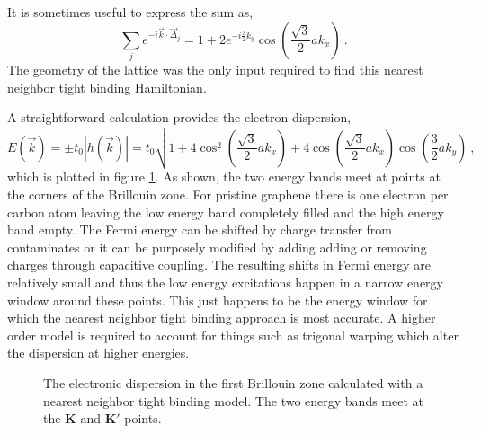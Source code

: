 It is sometimes useful to express the sum as,
\begin{equation*}
	\sum_{j} e^{-i \vec{k} \cdot \vec{\Delta}_j}
		=1+2 e^{-i \frac{3}{2} k_y}\cos \left(\frac{\sqrt{3}}{2} a k_x \right) \ .
\end{equation*}
The geometry of the lattice was the only input required to find this nearest neighbor tight binding Hamiltonian.

A straightforward calculation provides the electron dispersion,
\begin{equation*}
	E(\vec{k})=\pm t_0 |h(\vec{k})|=t_0 \sqrt{1+4 \cos^2 \left(\frac{\sqrt{3}}{2} a k_x\right)
		+4 \cos\left(\frac{\sqrt{3}}{2} a k_x \right) \cos \left(\frac{3}{2} a k_y\right)} \ ,
\end{equation*}
which is plotted in figure \ref{fig:TB:Dispersion}.
As shown, the two energy bands meet at points at the corners of the Brillouin zone.
For pristine graphene there is one electron per carbon atom leaving the low energy band completely filled and the high energy band empty.
The Fermi energy can be shifted by charge transfer from contaminates or it can be purposely modified by adding adding or removing charges through capacitive coupling.
The resulting shifts in Fermi energy are relatively small and thus the low energy excitations happen in a narrow energy window around these points.
This just happens to be the energy window for which the nearest neighbor tight binding approach is most accurate.
A higher order model is required to account for things such as trigonal warping which alter the dispersion at higher energies.

\begin{figure}
	\begin{center}
	
	\end{center}
	\caption{\label{fig:TB:Dispersion} The electronic dispersion in the first Brillouin zone calculated with a nearest neighbor tight binding model.  The two energy bands meet at the $\bm{K}$ and $\bm{K'}$ points.}	
\end{figure}

